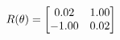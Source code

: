 \documentclass[preview]{standalone}
\begin{document}
\begin{align*}
\special{dvisvgm:raw <g id='unique000'>}R(\theta) = \begin{bmatrix}0.02 & 1.00\\-1.00 & 0.02\end{bmatrix}\special{dvisvgm:raw </g>}
\end{align*}
\end{document}
